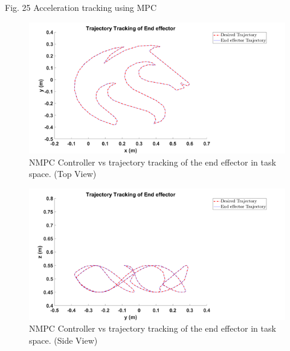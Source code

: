 \documentclass{UoNMCHA}
\numberwithin{equation}{section}
\begin{document}
	Fig. 25 Acceleration tracking using MPC
	
	\begin{figure}[H]
		\begin{center}
			\includegraphics[width=1\linewidth]{figs/Picture391}
			\caption{NMPC Controller vs trajectory tracking of the end effector in task space. (Top View)}
			\label{figs/Picture381}
		\end{center}
	\end{figure}
	
	\begin{figure}[H]
		\begin{center}
			\includegraphics[width=1\linewidth]{figs/Picture392}
			\caption{NMPC Controller vs trajectory tracking of the end effector in task space. (Side View)}
			\label{figs/Picture382}
		\end{center}
	\end{figure}
	
\end{document}
